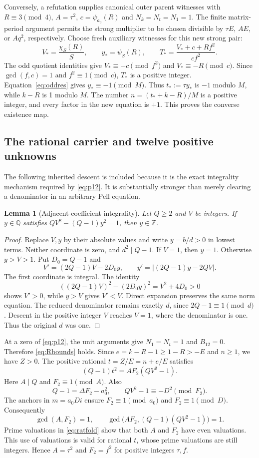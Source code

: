 \documentclass[11pt]{article}
\newtheorem{lemma}[theorem]{Lemma}
\theoremstyle{remark}\newtheorem{remark}[theorem]{Remark}
\begin{document}
Conversely, a refutation supplies canonical outer parent witnesses with
$R\equiv3\pmod4$, $A=\tau^2$, $c=\psi_{a_0}(R)$ and $N_k=N_t=N_1=1$.
The finite matrix-period argument permits the strong multiplier to be
chosen divisible by $\tau E$, $AE$, or $Aq^2$, respectively. Choose
fresh auxiliary witnesses for this new strong pair:
\[
 V_*=\frac{\chi_S(R)}{S},\qquad y_*=\psi_S(R),\qquad
 T_*=\frac{V_*+c+Rf^2}{cf^2}.
\]
The odd quotient identities give $V_*\equiv-c\pmod{f^2}$ and
$V_*\equiv-R\pmod c$. Since $\gcd(f,c)=1$ and $f^2\equiv1\pmod c$,
$T_*$ is a positive integer.
Equation~\eqref{eq:oddres} gives $y_*\equiv-1\pmod M$.
Thus $t_*:=\tau y_*$ is $-1$ modulo $M$, while $k-R$ is 1 modulo $M$.
The number $n=(t_*+k-R)/M$ is a positive integer, and every factor
in the new equation is $+1$. This proves the converse existence map.

\subsection{The rational carrier and twelve positive unknowns}

The following inherited descent is included because it is the exact
integrality mechanism required by \eqref{eq:p12}. It is substantially
stronger than merely clearing a denominator in an arbitrary Pell equation.

\begin{lemma}[Adjacent-coefficient integrality]\label{lem:integral}
Let $Q\ge2$ and $V$ be integers. If $y\in\mathbb Q$ satisfies
$QV^2-(Q-1)y^2=1$, then $y\in\mathbb Z$.
\end{lemma}
\begin{proof}
Replace $V,y$ by their absolute values and write $y=b/d>0$ in lowest
terms. Neither coordinate is zero, and $d^2\mid Q-1$. If $V=1$, then
$y=1$. Otherwise $y>V>1$. Put $D_0=Q-1$ and
\[
 V'=(2Q-1)V-2D_0y,\qquad
 y'=\bigl|(2Q-1)y-2QV\bigr|.
\]
The first coordinate is integral. The identity
\[
 ((2Q-1)V)^2-(2D_0y)^2=V^2+4D_0>0
\]
shows $V'>0$, while $y>V$ gives $V'<V$.
Direct expansion preserves the same norm equation. The reduced
denominator remains exactly $d$, since $2Q-1\equiv1\pmod d$.
Descent in the positive integer $V$ reaches $V=1$, where the denominator
is one. Thus the original $d$ was one.
\end{proof}

At a zero of \eqref{eq:p12}, the unit arguments give $N_1=N_t=1$
and $B_{12}=0$. Therefore \eqref{eq:Rbounds} holds. Since
$e=k-R-1\ge1-R>-E$ and $n\ge1$, we have $Z>0$.
The positive rational $t=Z/E=n+e/E$ satisfies
\begin{equation}\label{eq:ratfold}
 (Q-1)t^2=AF_2(QV^2-1).
\end{equation}
Here $A\mid Q$ and $F_2\equiv1\pmod A$. Also
\[
 Q-1=\Delta F_2-a_0^2,
 \qquad QV^2-1\equiv-D^2\pmod{F_2}.
\]
The anchors in $m=a_0Di$ ensure $F_2\equiv1\pmod{a_0}$ and
$F_2\equiv1\pmod D$. Consequently
\[
 \gcd(A,F_2)=1,\qquad
 \gcd\bigl(AF_2,(Q-1)(QV^2-1)\bigr)=1.
\]
Prime valuations in \eqref{eq:ratfold} show that both $A$ and $F_2$
have even valuations. This use of valuations is valid for rational
$t$, whose prime valuations are still integers. Hence
$A=\tau^2$ and $F_2=f^2$ for positive integers $\tau,f$.
\end{document}
